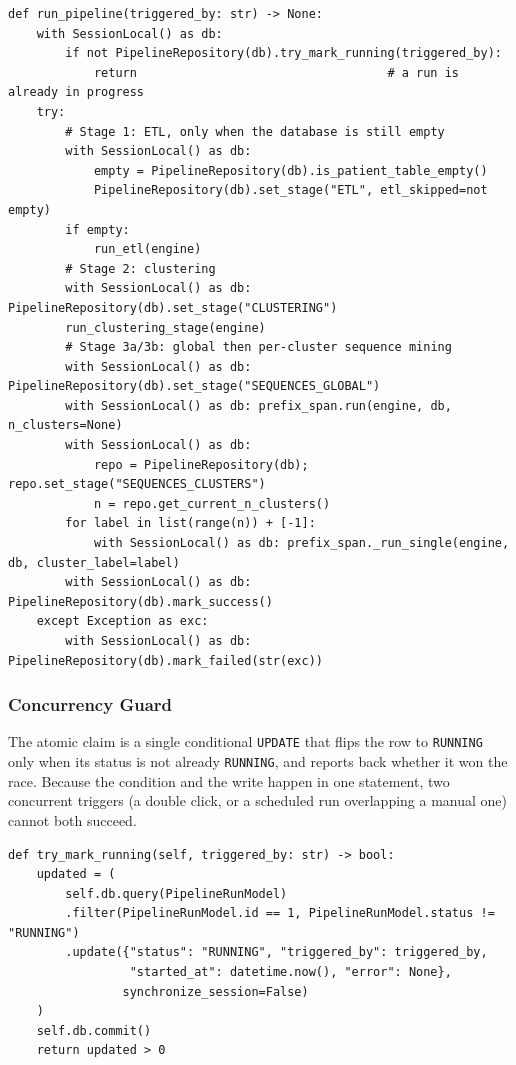 \begin{lstlisting}[style=pythonstyle]
def run_pipeline(triggered_by: str) -> None:
    with SessionLocal() as db:
        if not PipelineRepository(db).try_mark_running(triggered_by):
            return                                   # a run is already in progress
    try:
        # Stage 1: ETL, only when the database is still empty
        with SessionLocal() as db:
            empty = PipelineRepository(db).is_patient_table_empty()
            PipelineRepository(db).set_stage("ETL", etl_skipped=not empty)
        if empty:
            run_etl(engine)
        # Stage 2: clustering
        with SessionLocal() as db: PipelineRepository(db).set_stage("CLUSTERING")
        run_clustering_stage(engine)
        # Stage 3a/3b: global then per-cluster sequence mining
        with SessionLocal() as db: PipelineRepository(db).set_stage("SEQUENCES_GLOBAL")
        with SessionLocal() as db: prefix_span.run(engine, db, n_clusters=None)
        with SessionLocal() as db:
            repo = PipelineRepository(db); repo.set_stage("SEQUENCES_CLUSTERS")
            n = repo.get_current_n_clusters()
        for label in list(range(n)) + [-1]:
            with SessionLocal() as db: prefix_span._run_single(engine, db, cluster_label=label)
        with SessionLocal() as db: PipelineRepository(db).mark_success()
    except Exception as exc:
        with SessionLocal() as db: PipelineRepository(db).mark_failed(str(exc))
\end{lstlisting}

\subsubsection*{Concurrency Guard}

The atomic claim is a single conditional \texttt{UPDATE} that flips the row to \texttt{RUNNING} only when its status is not already \texttt{RUNNING}, and reports back whether it won the race. Because the condition and the write happen in one statement, two concurrent triggers (a double click, or a scheduled run overlapping a manual one) cannot both succeed.

\begin{lstlisting}[style=pythonstyle]
def try_mark_running(self, triggered_by: str) -> bool:
    updated = (
        self.db.query(PipelineRunModel)
        .filter(PipelineRunModel.id == 1, PipelineRunModel.status != "RUNNING")
        .update({"status": "RUNNING", "triggered_by": triggered_by,
                 "started_at": datetime.now(), "error": None},
                synchronize_session=False)
    )
    self.db.commit()
    return updated > 0
\end{lstlisting}

